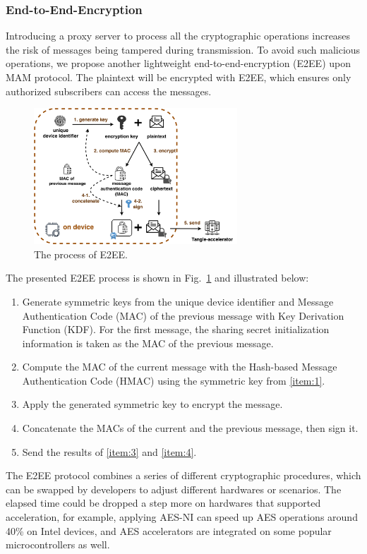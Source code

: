 \documentclass[10pt, conference, compsocconf]{IEEEtran}
\begin{document}
\subsubsection{End-to-End-Encryption}
Introducing a proxy server to process all the cryptographic operations increases the risk of messages being tampered during transmission. To avoid such malicious operations, we propose another lightweight end-to-end-encryption (E2EE) upon MAM protocol. The plaintext will be encrypted with E2EE, which ensures only authorized subscribers can access the messages.

\begin{figure}[!h]
    \centering
    \includegraphics[width=3in]{MAM_E2EE_fold}
    \caption{The process of E2EE.}
    \label{fig:MAM_E2EE}
\end{figure}

The presented E2EE process is shown in Fig.~\ref{fig:MAM_E2EE} and illustrated below:

\begin{enumerate}
    \item Generate symmetric keys from the unique device identifier and Message Authentication Code (MAC) of the previous message with Key Derivation Function (KDF). For the first message, the sharing secret initialization information is taken as the MAC of the previous message.\label{item:1}
    \item Compute the MAC of the current message with the Hash-based Message Authentication Code (HMAC) using the symmetric key from \ref{item:1}.
    \item Apply the generated symmetric key to encrypt the message.\label{item:3}
    \item Concatenate the MACs of the current and the previous message, then sign it.\label{item:4}
    \item Send the results of \ref{item:3} and \ref{item:4}.
\end{enumerate}

The E2EE protocol combines a series of different cryptographic procedures, which can be swapped by developers to adjust different hardwares or scenarios. The elapsed time could be dropped a step more on hardwares that supported acceleration, for example, applying AES-NI can speed up AES operations around 40\% on Intel devices\cite{AES-NI-Acceleration}, and AES accelerators are integrated on some popular microcontrollers as well\cite{stm}.
\end{document}
